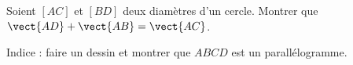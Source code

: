 
\begin{exercice}\label{exosmath-0073}

    Soient \( [AC]\) et \( [BD]\) deux diamètres d'un cercle. Montrer que \( \vect{ AD }+\vect{ AB }=\vect{ AC }\).

    Indice : faire un dessin et montrer que \( ABCD\) est un parallélogramme.

\end{exercice}
